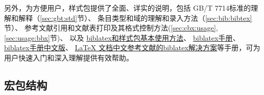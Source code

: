 \documentclass[11pt]{article} %
\begin{document}
\begin{enumerate}
另外，为方便用户，样式包提供了全面、详实的说明，包括
GB/T 7714标准的理解和解释（\ref{sec:gbt:std}节）、
条目类型和域的理解和录入方法（\ref{sec:bib:bibtex}节）、
参考文献引用和文献表打印及其格式控制方法(\ref{sec:cbx:usage},\ref{sec:usage:bbx}节)、
\hypertarget{lab:manual:hyper}{以及}
\href{https://github.com/hushidong/biblatex-gb7714-2015/wiki}{biblatex和样式包基本使用方法}、
\href{https://github.com/plk/biblatex}{biblatex手册}、
\href{https://github.com/hushidong/biblatex-zh-cn}{biblatex手册中文版}、
\href{https://github.com/hushidong/biblatex-solution-to-latex-bibliography}{LaTeX 文档中文参考文献的biblatex解决方案}等手册，可为用户快速入门和深入理解提供有效帮助。

\end{enumerate}


\subsection{宏包结构}
\end{document}

